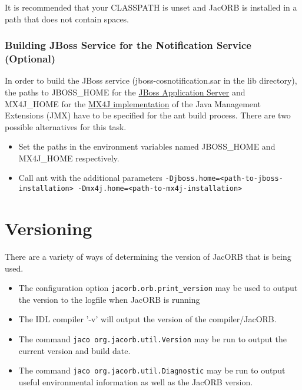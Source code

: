 It is recommended that your CLASSPATH is unset and JacORB is installed in a path that does
not contain spaces.

\subsubsection{Building JBoss Service for the Notification Service (Optional)}
In order to build the JBoss service (jboss-cosnotification.sar in the lib
directory), the paths to JBOSS\_HOME for the
\href{http://www.jboss.org/jbossas}{JBoss Application Server} and MX4J\_HOME
for the \href{http://mx4j.sourceforge.net}{MX4J implementation}
 of the Java Management Extensions (JMX) have to be specified for the ant build
process. There are two possible alternatives for this task.
\begin{itemize}
\item Set the paths in the environment variables named JBOSS\_HOME and MX4J\_HOME respectively.
\item Call ant with the additional parameters {\tt -Djboss.home=<path-to-jboss-installation> -Dmx4j.home=<path-to-mx4j-installation>}
\end{itemize}


\section{Versioning}
There are a variety of ways of determining the version of JacORB that is being used.
\begin{itemize}
\item The configuration option {\tt jacorb.orb.print\_version} may be used to output the version to the logfile when JacORB is running
\item The IDL compiler '-v' will output the version of the compiler/JacORB.
\item The command {\tt jaco org.jacorb.util.Version} may be run to output the current version and build date.
\item The command {\tt jaco org.jacorb.util.Diagnostic} may be run to output useful environmental information as well as the JacORB version.
\end{itemize}

